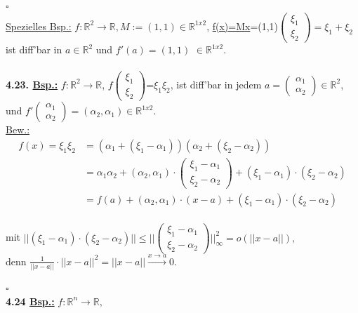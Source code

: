 \documentclass[]{scrartcl}
\begin{document}
\strut\hfill$\square$\\
\underline{Spezielles Bsp.:} $f:\mathbb{R}^2\rightarrow\mathbb{R}, 
M:=(1,1)\in\mathbb{R}^{1x2}$, \ul{f(x)=Mx}=(1,1)$\begin{pmatrix}
	\xi_1\\\xi_2
\end{pmatrix}=\xi_1+\xi_2$\\
ist diff'bar in $a\in\mathbb{R}^2$ und \ul{$f'(a)=(1,1)$} $\in 
\mathbb{R}^{1x2}.$\\
\\
\textbf{4.23. \underline{Bsp.:}} $f:\mathbb{R}^2\rightarrow\mathbb{R}$, 
\ul{$f\begin{pmatrix}
	\xi_1\\\xi_2
\end{pmatrix}$}=$\xi_1\xi_2$, ist diff'bar in jedem $a=\begin{pmatrix}
	\alpha_1\\\alpha_2
\end{pmatrix}\in\mathbb{R}^2$,\\
und \ul{$f'\begin{pmatrix}
	\alpha_1\\\alpha_2
\end{pmatrix}=(\alpha_2,\alpha_1)$}$\in\mathbb{R}^{1x2}$.\\
\underline{Bew.:}\\
\begin{align}
	f(x)=\xi_1\xi_2&=(\alpha_1+(\xi_1-\alpha_1))(\alpha_2+(\xi_2-\alpha_2))\\
	&=\alpha_1\alpha_2+(\alpha_2,\alpha_1)\cdot\begin{pmatrix}
		\xi_1-\alpha_1\\\xi_2-\alpha_2
	\end{pmatrix}+(\xi_1-\alpha_1)\cdot(\xi_2-\alpha_2)\\
	&=f(a)+(\alpha_2,\alpha_1)\cdot(x-a)+(\xi_1-\alpha_1)\cdot(\xi_2-\alpha_2)
\end{align}\\
mit $||(\xi_1-\alpha_1)\cdot(\xi_2-\alpha_2)||\leq||\begin{pmatrix}
	\xi_1-\alpha_1\\\xi_2-\alpha_2
\end{pmatrix}||_\infty^2=o(||x-a||),$\\
denn $\frac{1}{||x-a||}\cdot||x-a||^2=||x-a||\xrightarrow{x\rightarrow a}0.$\\
\strut\hfill$\square$\\
\textbf{4.24 \underline{Bsp.:}} $f:\mathbb{R}^n\rightarrow\mathbb{R},$ 
\end{document}
